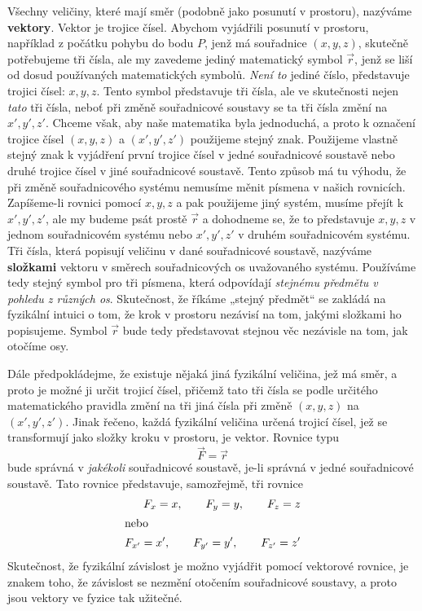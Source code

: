 {    Všechny veličiny, které mají směr (podobně jako posunutí v prostoru), nazýváme 
    \textbf{vektory}. Vektor je trojice čísel. Abychom vyjádřili posunutí v prostoru, například z 
    počátku pohybu do bodu \(P\), jenž má souřadnice \((x, y, z)\), skutečně potřebujeme tři čísla, 
    ale my zavedeme jediný matematický symbol \(\vec{r}\), jenž se liší od dosud používaných 
    matematických symbolů. \emph{Není to} jediné číslo, představuje trojici čísel: \(x, y, z\). 
    Tento symbol představuje tři čísla, ale ve skutečnosti nejen \emph{tato} tři čísla, neboť při 
    změně souřadnicové soustavy se ta tři čísla změní na \(x', y', z'\). Chceme však, aby naše 
    matematika byla jednoduchá, a proto k označení trojice čísel \((x, y, z)\) a \((x', y', z')\) 
    použijeme stejný znak. Použijeme vlastně stejný znak k vyjádření první trojice čísel v jedné 
    souřadnicové soustavě nebo druhé trojice čísel v jiné souřadnicové soustavě. Tento způsob má tu 
    výhodu, že při změně souřadnicového systému nemusíme měnit písmena v našich rovnicích. 
    Zapíšeme-li rovnici pomocí \(x, y, z\) a pak použijeme jiný systém, musíme přejít k \(x', y', 
    z'\), ale my budeme psát prostě \(\vec{r}\) a dohodneme se, že to představuje \(x, y, z\) v 
    jednom souřadnicovém systému nebo \(x', y', z'\) v druhém souřadnicovém systému. Tři čísla, 
    která popisují veličinu v dané souřadnicové soustavě, nazýváme \textbf{složkami} vektoru v 
    směrech souřadnicových os uvažovaného systému. Používáme tedy stejný symbol pro tři písmena, 
    která odpovídají \emph{stejnému předmětu v pohledu z různých os}. Skutečnost, že říkáme „stejný 
    předmět“ se zakládá na fyzikální intuici o tom, že krok v prostoru nezávisí na tom, jakými 
    složkami ho popisujeme. Symbol \(\vec{r}\) bude tedy představovat stejnou věc nezávisle na tom, 
    jak otočíme osy.
    
    Dále předpokládejme, že existuje nějaká jiná fyzikální veličina, jež má směr, a proto je možné 
    ji určit trojicí čísel, přičemž tato tři čísla se podle určitého matematického pravidla změní 
    na tři jiná čísla při změně \((x, y, z)\) na \((x', y', z')\). Jinak řečeno, každá fyzikální 
    veličina určená trojicí čísel, jež se transformují jako složky kroku v prostoru, je vektor. 
    Rovnice typu
    \begin{equation*}
     \vec{F} = \vec{r}
    \end{equation*}
    bude správná v \emph{jakékoli} souřadnicové soustavě, je-li správná v jedné souřadnicové 
    soustavě. Tato rovnice představuje, samozřejmě, tři rovnice
    \begin{align*}
      F_x = x,     \qquad F_y = y,     \qquad F_z = z       \\
      \shortintertext{nebo}
      F_{x'} = x', \qquad F_{y'} = y', \qquad F_{z'} = z'   \\
    \end{align*}
    Skutečnost, že fyzikální závislost je možno vyjádřit pomocí vektorové rovnice, je znakem toho, 
    že závislost se nezmění otočením souřadnicové soustavy, a proto jsou vektory ve fyzice tak 
    užitečné.
    
}

